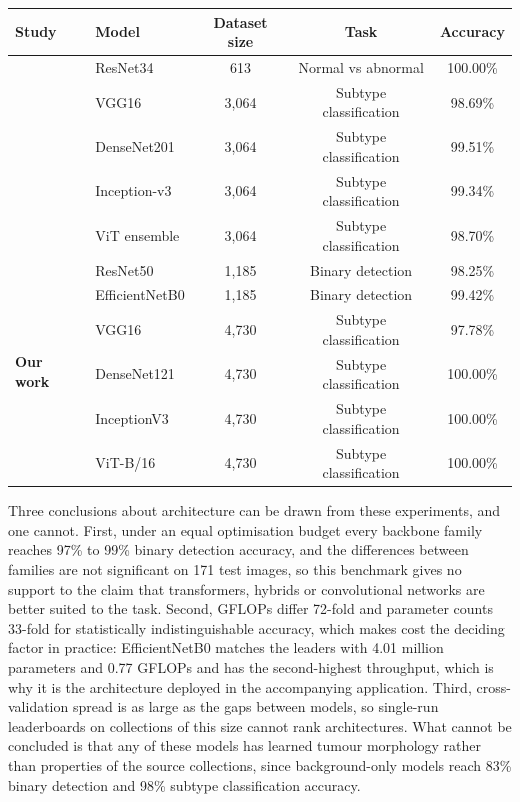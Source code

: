 \documentclass[a4paper,fleqn]{cas-sc}
\begin{document}
\begin{heretable}
\centering
\caption{Present results beside previously published studies. For this work, the dataset size is the deduplicated pool and accuracy is fold-ensemble accuracy on its held-out test set (171 binary detection and 45 subtype classification images).}
\label{tab:literature-comparison}
\small
\begin{tabular*}{\textwidth}{@{\extracolsep{\fill}}llccc@{}}
\toprule
Study & Model & Dataset size & Task & Accuracy \\
\midrule
\citet{talo2019} & ResNet34 & 613 & Normal vs abnormal & 100.00\% \\
\citet{rehman2020} & VGG16 & 3,064 & Subtype classification & 98.69\% \\
\citet{noreen2020} & DenseNet201 & 3,064 & Subtype classification & 99.51\% \\
\citet{noreen2020} & Inception-v3 & 3,064 & Subtype classification & 99.34\% \\
\citet{tummala2022} & ViT ensemble & 3,064 & Subtype classification & 98.70\% \\
\midrule
\multirow{6}{*}{\textbf{Our work}} & ResNet50 & 1,185 & Binary detection & 98.25\% \\
 & EfficientNetB0 & 1,185 & Binary detection & 99.42\% \\
 & VGG16 & 4,730 & Subtype classification & 97.78\% \\
 & DenseNet121 & 4,730 & Subtype classification & 100.00\% \\
 & InceptionV3 & 4,730 & Subtype classification & 100.00\% \\
 & ViT-B/16 & 4,730 & Subtype classification & 100.00\% \\
\bottomrule
\end{tabular*}
\end{heretable}

Three conclusions about architecture can be drawn from these experiments, and one cannot. First, under an equal optimisation budget every backbone family reaches 97\% to 99\% binary detection accuracy, and the differences between families are not significant on 171 test images, so this benchmark gives no support to the claim that transformers, hybrids or convolutional networks are better suited to the task. Second, GFLOPs differ 72-fold and parameter counts 33-fold for statistically indistinguishable accuracy, which makes cost the deciding factor in practice: EfficientNetB0 matches the leaders with 4.01 million parameters and 0.77 GFLOPs and has the second-highest throughput, which is why it is the architecture deployed in the accompanying application. Third, cross-validation spread is as large as the gaps between models, so single-run leaderboards on collections of this size cannot rank architectures. What cannot be concluded is that any of these models has learned tumour morphology rather than properties of the source collections, since background-only models reach 83\% binary detection and 98\% subtype classification accuracy.
\end{document}
